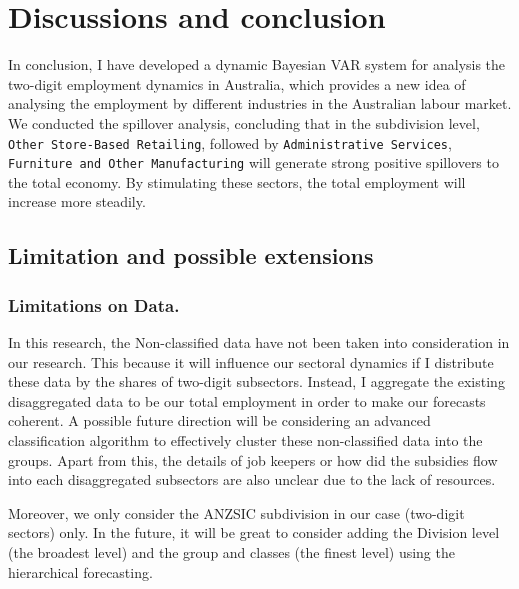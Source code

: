 \documentclass{monashthesis}
\begin{document}
\clearpage

\hypertarget{discussions-and-conclusion}{%
\chapter{Discussions and conclusion}\label{discussions-and-conclusion}}

In conclusion, I have developed a dynamic Bayesian VAR system for analysis the two-digit employment dynamics in Australia, which provides a new idea of analysing the employment by different industries in the Australian labour market. We conducted the spillover analysis, concluding that in the subdivision level, \texttt{Other\ Store-Based\ Retailing}, followed by \texttt{Administrative\ Services}, \texttt{Furniture\ and\ Other\ Manufacturing} will generate strong positive spillovers to the total economy. By stimulating these sectors, the total employment will increase more steadily.

\hypertarget{limitation-and-possible-extensions}{%
\section{Limitation and possible extensions}\label{limitation-and-possible-extensions}}

\hypertarget{limitations-on-data.}{%
\subsection{Limitations on Data.}\label{limitations-on-data.}}

In this research, the Non-classified data have not been taken into consideration in our research. This because it will influence our sectoral dynamics if I distribute these data by the shares of two-digit subsectors. Instead, I aggregate the existing disaggregated data to be our total employment in order to make our forecasts coherent. A possible future direction will be considering an advanced classification algorithm to effectively cluster these non-classified data into the groups. Apart from this, the details of job keepers or how did the subsidies flow into each disaggregated subsectors are also unclear due to the lack of resources.

Moreover, we only consider the ANZSIC subdivision in our case (two-digit sectors) only. In the future, it will be great to consider adding the Division level (the broadest level) and the group and classes (the finest level) using the hierarchical forecasting.
\end{document}
